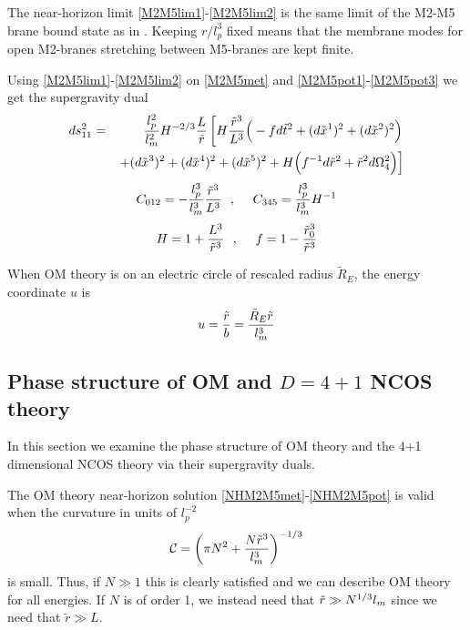 \documentclass[a4paper,twoside,titlepage,12pt]{article}
\begin{document}
The near-horizon limit \eqref{M2M5lim1}-\eqref{M2M5lim2} 
is the same limit of the M2-M5 brane bound state
as in \cite{Alishahiha:1999ci,Harmark:1999rb}.
Keeping $r/l_p^3$ fixed means that the membrane modes for open
M2-branes stretching between M5-branes are kept finite.

Using \eqref{M2M5lim1}-\eqref{M2M5lim2} on
\eqref{M2M5met} and \eqref{M2M5pot1}-\eqref{M2M5pot3} 
we get the supergravity dual
%
\begin{eqnarray}
\label{NHM2M5met}
ds_{11}^2 &=& \frac{l_p^2}{l_m^2} H^{-2/3} \frac{L}{\tilde{r}} \left[
H \frac{\tilde{r}^3}{L^3} \Big( - f d\tilde{t}^2 
+ (d\tilde{x}^1)^2 + (d\tilde{x}^2)^2 \Big)
\right. \nonumber \\ && \left.
+ (d\tilde{x}^3)^2 + (d\tilde{x}^4)^2 + (d\tilde{x}^5)^2 
+ H \Big( f^{-1} d\tilde{r}^2 + \tilde{r}^2 d\Omega_4^2 \Big) \right]
\end{eqnarray}
%
\begin{equation}
\label{NHM2M5pot}
C_{012} = - \frac{l_p^3}{l_m^3} \frac{\tilde{r}^3}{L^3}
\ \ ,\ \ \ \ 
C_{345} = \frac{l_p^3}{l_m^3} H^{-1}
\end{equation}
%
\begin{equation}
\label{NHM2M5defs}
H = 1 + \frac{L^3}{\tilde{r}^3} \ \ ,\ \ \ \ 
f = 1 - \frac{\tilde{r}_0^3}{\tilde{r}^3}
\end{equation}
%

When OM theory is on an electric circle of 
rescaled radius $\tilde{R}_E$, the energy coordinate $u$ is
%
\begin{equation}
u = \frac{\tilde{r}}{b} = \frac{\tilde{R}_E \tilde{r}}{l_m^3}
\end{equation}

\subsection{Phase structure of OM and $D=4+1$ NCOS theory}
\label{secOMphases}

In this section we examine the phase structure of OM theory
and the 4+1 dimensional NCOS theory via their supergravity duals.

The OM theory near-horizon solution \eqref{NHM2M5met}-\eqref{NHM2M5pot} 
is valid when the curvature in units of \( l_p^{-2} \) 
%
\begin{equation}
\label{OMcurv}
\mathcal{C} = \left( \pi N^2 + \frac{N \tilde{r}^3}{l_m^3} \right)^{-1/3}
\end{equation}
%
is small.
Thus, if $N \gg 1$ this is clearly satisfied and we can describe 
OM theory for all energies. 
If $N$ is of order 1, we instead need that \( \tilde{r} \gg N^{1/3} l_m \)
since we need that \( \tilde{r} \gg L \).
\end{document}
